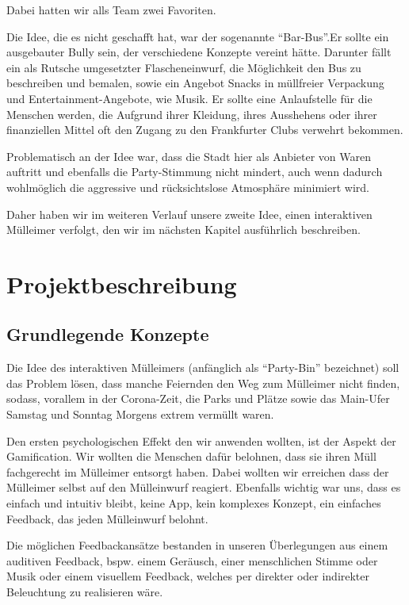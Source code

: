     Dabei hatten wir alls Team zwei Favoriten.

    Die Idee, die es nicht geschafft hat, war der sogenannte \enquote{Bar-Bus}.Er sollte ein ausgebauter Bully sein, der verschiedene Konzepte vereint hätte. Darunter fällt ein  als Rutsche umgesetzter Flascheneinwurf, die Möglichkeit den Bus zu beschreiben und bemalen, sowie ein Angebot Snacks in müllfreier Verpackung und Entertainment-Angebote, wie Musik.
    Er sollte eine Anlaufstelle für die Menschen werden, die Aufgrund ihrer Kleidung, ihres Ausshehens oder ihrer finanziellen Mittel oft den Zugang  zu den Frankfurter Clubs verwehrt bekommen.

    Problematisch an der Idee war, dass die Stadt hier als Anbieter von Waren auftritt und ebenfalls die Party-Stimmung nicht mindert, auch wenn dadurch wohlmöglich die aggressive und rücksichtslose Atmosphäre minimiert wird.

    Daher haben wir im weiteren Verlauf unsere zweite Idee, einen interaktiven Mülleimer verfolgt, den wir im nächsten Kapitel ausführlich beschreiben.


\chapter{Projektbeschreibung}

\section{Grundlegende Konzepte}
    
    Die Idee des interaktiven Mülleimers (anfänglich als \enquote{Party-Bin} bezeichnet) soll das Problem lösen, dass manche Feiernden den Weg zum Mülleimer nicht finden, sodass, vorallem in der Corona-Zeit, die Parks und Plätze sowie das Main-Ufer Samstag und Sonntag Morgens extrem vermüllt waren.

    Den ersten psychologischen Effekt den wir anwenden wollten, ist der Aspekt der Gamification. Wir wollten die Menschen dafür belohnen, dass sie ihren Müll fachgerecht im Mülleimer entsorgt haben. Dabei wollten wir erreichen dass der Mülleimer selbst auf den Mülleinwurf reagiert. Ebenfalls wichtig war uns, dass es einfach und intuitiv bleibt, keine App, kein komplexes Konzept, ein einfaches Feedback, das jeden Mülleinwurf belohnt.

    Die möglichen Feedbackansätze bestanden in unseren Überlegungen aus einem auditiven Feedback, bspw. einem Geräusch, einer menschlichen Stimme oder  Musik oder einem visuellem Feedback, welches per direkter oder indirekter Beleuchtung zu realisieren wäre.

